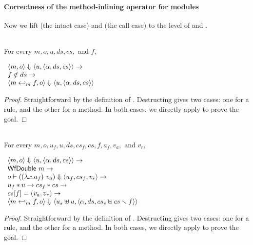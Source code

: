 \paragraph{Correctness of the method-inlining operator for modules}

Now we lift  (the intact case) and
 (the call case) to the level of
\Substep{} and \Substeps{}.

\begin{lemma}
  \label{lem-inlinedmm-substep-intact}
  \mbox{}\\
  For every $m, o, u, ds, cs,$ and $f,$
  \begin{center}
    \begin{math}
      \begin{array}{l}
        \langle m, o \rangle \Downarrow \langle u, \langle \alpha, ds, cs \rangle \rangle \to \\
        f \notin ds \to \\
        \langle m \hookleftarrow_{m}{} f, o \rangle \Downarrow \langle u, \langle \alpha, ds, cs \rangle \rangle
      \end{array}
    \end{math}
  \end{center}
\end{lemma}
\begin{proof}
  Straightforward by the definition of \Substep{}. Destructing
  \Substep{} gives two cases: one for a rule, and the other for a
  method. In both cases, we directly apply
   to prove the goal.
\end{proof}

\begin{lemma}
  \label{lem-inlinedmm-substep-call}
  \mbox{}\\
  For every $m, o, u_f, u, ds, cs_f, cs, f, a_f, v_a,$ and $v_r,$
  \begin{center}
    \begin{math}
      \begin{array}{l}
        \langle m, o \rangle \Downarrow \langle u, \langle \alpha, ds, cs \rangle \rangle \to \\
        \textsf{WfDouble}\ m \to \\
        o |- ((\lambda x.a_f)\ v_a) \Downarrow \langle u_f, cs_f, v_r \rangle \to \\
        u_f \ast u \to cs_f \ast cs \to \\
        cs[f] = (v_a, v_r) \to \\
        \langle m \hookleftarrow_{m}{} f, o \rangle \Downarrow \langle u_s \uplus u, \langle \alpha, ds, cs_s \uplus cs \smallsetminus{} f \rangle \rangle
      \end{array}
    \end{math}
  \end{center}
\end{lemma}
\begin{proof}
  Straightforward by the definition of \Substep{}. Destructing
  \Substep{} gives two cases: one for a rule, and the other for a
  method. In both cases, we directly apply
   to prove the goal.
\end{proof}

